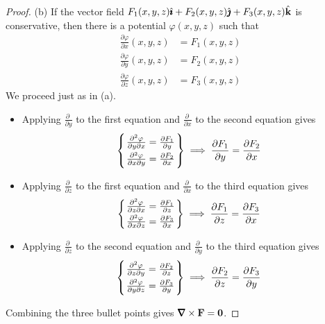 \begin{proof}
\noindent (b) 
If the vector field $F_1(x,y,z)\hat{\pmb{\imath}} + F_2(x,y,z)\hat{\pmb{\jmath}} + F_3(x,y,z)\hat{\mathbf{k}}$ 
is conservative, then there is a potential $\varphi(x,y,z)$ such that
\begin{align*}
\frac{\partial \varphi}{\partial x}(x,y,z) &= F_1(x,y,z) \\
\frac{\partial \varphi}{\partial y}(x,y,z) &= F_2(x,y,z) \\
\frac{\partial \varphi}{\partial z}(x,y,z) &= F_3(x,y,z) 
\end{align*}
We proceed just as in (a).
\begin{itemize}\itemsep1pt \parskip0pt  %
\item Applying
$\frac{\partial\ }{\partial y}$ to the first equation and 
$\frac{\partial\ }{\partial x}$ to the second equation gives
\begin{align*}
\left\{\atp{  \frac{\partial^2 \varphi}{\partial y\partial x}
                    = \frac{\partial F_1}{\partial y}  }
             {  \frac{\partial^2 \varphi}{\partial x\partial y}
                  = \frac{\partial F_2}{\partial x} }\right\}
\implies \frac{\partial F_1}{\partial y} = \frac{\partial F_2}{\partial x} 
\end{align*}
\item Applying
$\frac{\partial\ }{\partial z}$ to the first equation and 
$\frac{\partial\ }{\partial x}$ to the third equation gives
\begin{align*}
\left\{\atp{  \frac{\partial^2 \varphi}{\partial z\partial x}
                    = \frac{\partial F_1}{\partial z}  }
             {  \frac{\partial^2 \varphi}{\partial x\partial z}
                  = \frac{\partial F_3}{\partial x} }\right\}
\implies \frac{\partial F_1}{\partial z} = \frac{\partial F_3}{\partial x} 
\end{align*}
\item Applying
$\frac{\partial\ }{\partial z}$ to the second equation and 
$\frac{\partial\ }{\partial y}$ to the third equation gives
\begin{align*}
\left\{\atp{  \frac{\partial^2 \varphi}{\partial z\partial y}
                    = \frac{\partial F_2}{\partial z}  }
             {  \frac{\partial^2 \varphi}{\partial y\partial z}
                  = \frac{\partial F_3}{\partial y} }\right\}
\implies \frac{\partial F_2}{\partial z} = \frac{\partial F_3}{\partial y} 
\end{align*}

\end{itemize}
Combining the three bullet points gives $\vnabla\times\vF=\vZero$.
\end{proof}

